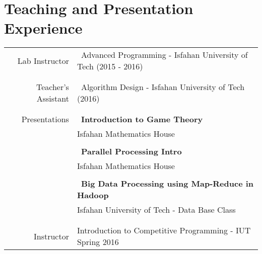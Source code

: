 \documentclass[a4paper,10pt]{article}
\begin{document}
\section{Teaching and Presentation Experience}
\begin{tabular}{r|p{11cm}}
	Lab Instructor 
	& \textbullet \ Advanced Programming - Isfahan University of Tech (2015 - 2016)\\
	
	
	\\ \multicolumn{2}{c}{} \\
	
	Teacher's Assistant & \textbullet \ Algorithm Design - Isfahan University of Tech (2016)\\ 
	
	
	
	\\ \multicolumn{2}{c}{} \\
	
	Presentations
	& \textbullet \ \textbf{Introduction to Game Theory} \\ & Isfahan Mathematics House \\
	\\ & \textbullet \ \textbf{Parallel Processing Intro} \\ & Isfahan Mathematics House \\
	\\ & \textbullet \ \textbf{Big Data Processing using Map-Reduce in Hadoop} \\ & Isfahan University of Tech - Data Base Class \\
	
	
	
	\\ \multicolumn{2}{c}{} \\
	
	
	Instructor & Introduction to Competitive Programming - IUT Spring 2016 
	
\end{tabular}


\end{document}
